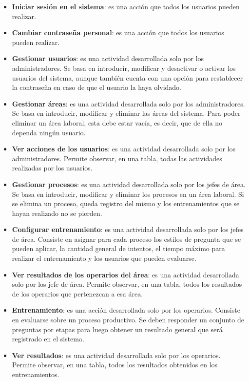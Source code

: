 \begin{itemize}
\item \textbf{Iniciar sesión en el sistema}: es una acción que todos los usuarios pueden realizar.
\item \textbf{Cambiar contraseña personal}: es una acción que todos los usuarios pueden realizar.
\item \textbf{Gestionar usuarios}: es una actividad desarrollada solo por los administradores. Se basa en introducir, modificar y desactivar o activar los usuarios del sistema, aunque también cuenta con una opción para restablecer la contraseña en caso de que el usuario la haya olvidado.
\item \textbf{Gestionar áreas}: es una actividad desarrollada solo por los administradores. Se basa en introducir, modificar y eliminar las áreas del sistema. Para poder eliminar un área laboral, esta debe estar vacía, es decir, que de ella no dependa ningún usuario.
\item \textbf{Ver acciones de los usuarios}: es una actividad desarrollada solo por los administradores. Permite observar, en una tabla, todas las actividades realizadas por los usuarios.

\item \textbf{Gestionar procesos}: es una actividad desarrollada solo por los jefes de área. Se basa en introducir, modificar y eliminar los procesos en un área laboral. Si se elimina un proceso, queda registro del mismo y los entrenamientos que se hayan realizado no se pierden.
\item \textbf{Configurar entrenamiento}: es una actividad desarrollada solo por los jefes de área. Consiste en asignar para cada proceso los estilos de pregunta que se pueden aplicar, la cantidad general de intentos, el tiempo máximo para realizar el entrenamiento y los usuarios que pueden evaluarse.
\item \textbf{Ver resultados de los operarios del área}: es una actividad desarrollada solo por los jefe de área. Permite observar, en una tabla, todos los resultados de los operarios que pertenezcan a esa área.

\item \textbf{Entrenamiento}: es una acción desarrollada solo por los operarios. Consiste en evaluarse sobre un proceso productivo. Se deben responder un conjunto de preguntas por etapas para luego obtener un resultado general que será registrado en el sistema.
\item \textbf{Ver resultados}: es una actividad desarrollada solo por los operarios. Permite observar, en una tabla, todos los resultados obtenidos en los entrenamientos.
\end{itemize}

